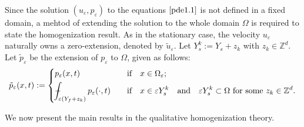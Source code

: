 \documentclass[13pt,CJK]{article}
\theoremstyle{plain}                       %
\theoremstyle{remark}
\numberwithin{equation}{section}
\def\Xint#1{\mathchoice
  {\XXint\displaystyle\textstyle{#1}}%
  {\XXint\textstyle\scriptstyle{#1}}%
  {\XXint\scriptstyle\scriptscriptstyle{#1}}%
  {\XXint\scriptscriptstyle\scriptscriptstyle{#1}}%
  \!\int}
\def\XXint#1#2#3{{\setbox0=\hbox{$#1{#2#3}{\int}$}
  \vcenter{\hbox{$#2#3$}}\kern-.5\wd0}}
\def\dashint{\Xint-}
\begin{document}
Since the solution $(u_\varepsilon,p_\varepsilon)$ to the equations
$\eqref{pde1.1}$ is not defined in a fixed domain, a mehtod of extending the solution to the whole domain $\Omega$ is required to state the homogenization result.
As in the stationary case, the velocity
$u_\varepsilon$ naturally owns a zero-extension,
denoted by $\tilde{u}_\varepsilon$.
Let $Y_s^k := Y_s+z_k$ with $z_k\in \mathbb{Z}^d$. Let  $\tilde{p}_{\varepsilon}$ be the extension of $p_{\varepsilon}$ to $\Omega$, given as follows:
\begin{equation}\label{eq1.1}
\tilde{p}_{\varepsilon}(x,t):=
\left\{
\begin{aligned}
&p_{\varepsilon}(x,t)&\quad&\text{if}\quad x\in\Omega_{\varepsilon};\\
&\dashint_{\varepsilon(Y_f+z_{k})}p_{\varepsilon}(\cdot,t)&\quad&\text{if}
\quad x\in\varepsilon Y_{s}^k \quad\text{and}\quad
\varepsilon Y^k_s\subset\Omega \text{~for~some~}z_{k}\in \mathbb{Z}^d.
\end{aligned}\right.
\end{equation}

We now present the main results in the qualitative homogenization theory.
\end{document}
